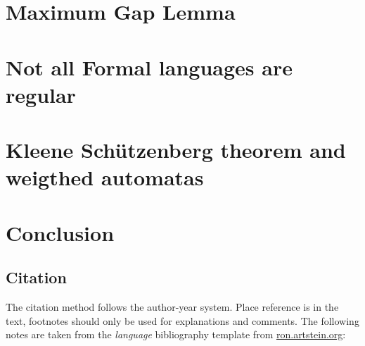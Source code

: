 \documentclass[12pt,letterpaper]{article}
\begin{document}
\section{Maximum Gap Lemma}
\section{Not all Formal languages are regular}
\section{Kleene Schützenberg theorem and weigthed automatas}
\section{Conclusion}


\subsection{Citation} 
\label{sec:cit}

The citation method follows the author-year system. Place reference is in the text, footnotes should only be used for explanations and comments. The following notes are taken from the \emph{language} bibliography template from \url{ron.artstein.org}:\newline
\end{document}
